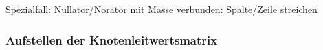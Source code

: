 \documentclass[fs, footer]{latex4ei}
\begin{document}
\begin{multicols*}{4}
\begin{enumerate}
    \end{enumerate}
    Spezialfall: Nullator/Norator mit Masse verbunden: Spalte/Zeile streichen
    \subsubsection{Aufstellen der Knotenleitwertsmatrix}
    \tiny
\end{multicols*}
\end{document}
